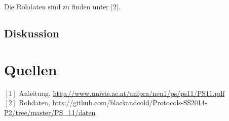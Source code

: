 \documentclass[12pt,a4paper]{article}
\begin{document}
\begin{multicols}{2}



\noindent Die Rohdaten sind zu finden unter [2].

\subsection{Diskussion}


\section{Quellen}
$[1]$ Anleitung, \url{http://www.univie.ac.at/anfpra/neu1/ps/ps11/PS11.pdf}\\
$[2]$ Rohdaten, \url{htts://github.com/blackandcold/Protocols-SS2014-P2/tree/master/PS_11/daten}\\

\end{multicols}
\end{document}
